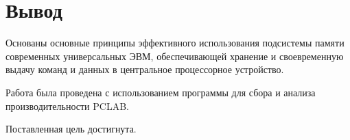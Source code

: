 \chapter*{Вывод}

Основаны основные принципы эффективного использования подсистемы памяти современных универсальных ЭВМ, обеспечивающей хранение и своевременную выдачу команд и данных в центральное процессорное устройство. 

Работа была проведена с использованием программы для сбора и анализа производительности PCLAB.

Поставленная цель достигнута.